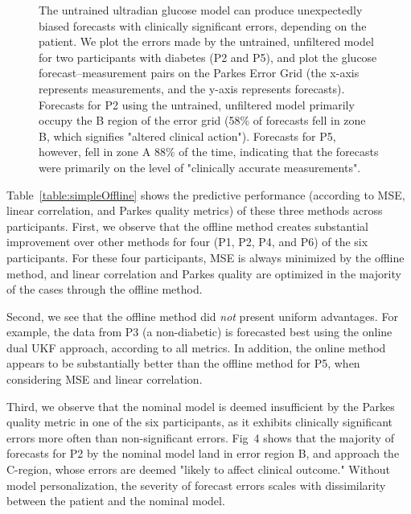 \documentclass[10pt,letterpaper]{article}
\begin{document}
\begin{figure}[!tbp]
  \centering
  \caption{The untrained ultradian glucose model can produce unexpectedly biased forecasts with clinically significant errors, depending on the patient. We plot the errors made by the untrained, unfiltered model for two participants with diabetes (P2 and P5), and plot the glucose forecast--measurement pairs on the Parkes Error Grid (the x-axis represents measurements, and the y-axis represents forecasts). Forecasts for P2 using the untrained, unfiltered model primarily occupy the B region of the error grid (58\% of forecasts fell in zone B, which signifies "altered clinical action"). Forecasts for P5, however, fell in zone A 88\% of the time, indicating that the forecasts were primarily on the level of "clinically accurate measurements".}
\label{fig:ErrorGrids}
\end{figure}


Table~\ref{table:simpleOffline} shows the predictive performance (according to MSE, linear correlation, and Parkes quality metrics) of these three methods across participants.
First, we observe that the offline method creates substantial improvement over other methods for four (P1, P2, P4, and P6) of the six participants. For these four participants, MSE is always minimized by the offline method, and linear correlation and Parkes quality are optimized in the majority of the cases through the offline method.

Second, we see that the offline method did \emph{not} present uniform advantages. For example, the data from P3 (a non-diabetic) is forecasted best using the online dual UKF approach, according to all metrics. In addition, the online method appears to be substantially better than the offline method for P5, when considering MSE and linear correlation. 

Third, we observe that the nominal model is deemed insufficient by the Parkes quality metric in one of the six participants, as it exhibits clinically significant errors more often than non-significant errors. Fig~4 shows that the majority of forecasts for P2 by the nominal model land in error region B, and approach the C-region, whose errors are deemed "likely to affect clinical outcome." Without model personalization, the severity of forecast errors scales with dissimilarity between the patient and the nominal model.
\end{document}
